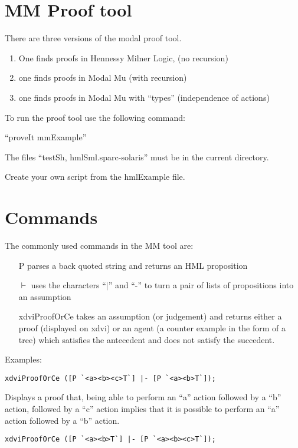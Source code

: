\documentclass[12pt]{article}
\begin{document}
\section{MM Proof tool}
There are three versions of the modal proof tool.
\begin{enumerate}
\item One finds proofs in Hennessy Milner Logic, (no recursion)
\item one finds proofs in Modal Mu (with recursion)
\item one finds proofs in Modal Mu with ``types'' (independence of actions)
\end{enumerate}

To run the proof tool use the following command:

``proveIt mmExample''

The files ``testSh, hmlSml.sparc-solaris'' must be in the current directory.

Create your own script from the hmlExample file.




\section{Commands}
The commonly used commands in the MM tool are:

\begin{itemize}
\item[P] parses a back quoted string and returns an HML proposition
\item[$\vdash$] uses the characters ``$\mid$'' and ``-'' to
      turn a pair of lists of propositions into an assumption
\item[xdviProofOrCe] takes an assumption (or judgement) and returns
     either a proof (displayed on xdvi) or an agent (a counter example
     in the form of a tree) which satisfies the antecedent
     and does not satisfy the succedent.
\end{itemize}

Examples:

\begin{verbatim}
xdviProofOrCe ([P `<a><b><c>T`] |- [P `<a><b>T`]);
\end{verbatim}

Displays a proof that, being able to perform an ``a'' action followed by
a ``b'' action, followed by a ``c'' action implies that it is possible to
perform an ``a'' action followed by a ``b'' action.

\begin{verbatim}
xdviProofOrCe ([P `<a><b>T`] |- [P `<a><b><c>T`]);
\end{verbatim}
\end{document}
